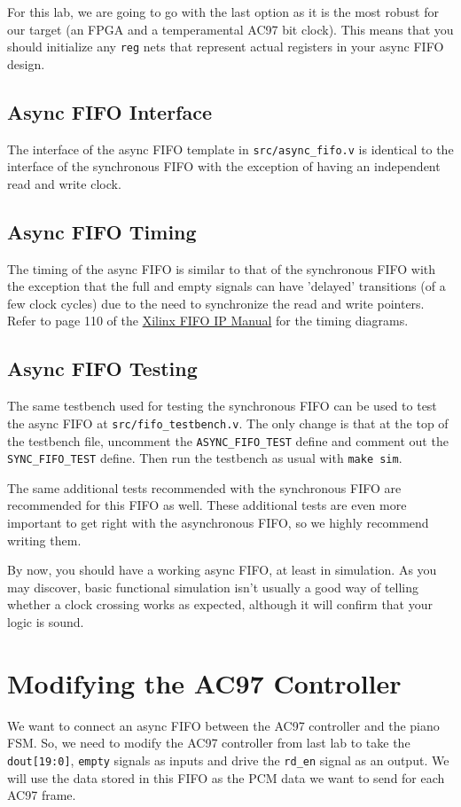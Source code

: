 \documentclass[11pt]{article}
\begin{document}
For this lab, we are going to go with the last option as it is the most robust for our target (an FPGA and a temperamental AC97 bit clock). This means that you should initialize any \verb|reg| nets that represent actual registers in your async FIFO design.

\subsection{Async FIFO Interface}
The interface of the async FIFO template in \verb|src/async_fifo.v| is identical to the interface of the synchronous FIFO with the exception of having an independent read and write clock.

\subsection{Async FIFO Timing}
The timing of the async FIFO is similar to that of the synchronous FIFO with the exception that the full and empty signals can have 'delayed' transitions (of a few clock cycles) due to the need to synchronize the read and write pointers. Refer to page 110 of the \href{https://www.xilinx.com/support/documentation/ip_documentation/fifo_generator_ug175.pdf}{Xilinx FIFO IP Manual} for the timing diagrams.

\subsection{Async FIFO Testing}
The same testbench used for testing the synchronous FIFO can be used to test the async FIFO at \verb|src/fifo_testbench.v|. The only change is that at the top of the testbench file, uncomment the \verb|ASYNC_FIFO_TEST| define and comment out the \verb|SYNC_FIFO_TEST| define. Then run the testbench as usual with \verb|make sim|.

The same additional tests recommended with the synchronous FIFO are recommended for this FIFO as well. These additional tests are even more important to get right with the asynchronous FIFO, so we highly recommend writing them.

By now, you should have a working async FIFO, at least in simulation. As you may discover, basic functional simulation isn't usually a good way of telling whether a clock crossing works as expected, although it will confirm that your logic is sound.

\section{Modifying the AC97 Controller}
We want to connect an async FIFO between the AC97 controller and the piano FSM. So, we need to modify the AC97 controller from last lab to take the \verb|dout[19:0]|, \verb|empty| signals as inputs and drive the \verb|rd_en| signal as an output. We will use the data stored in this FIFO as the PCM data we want to send for each AC97 frame.
\end{document}
